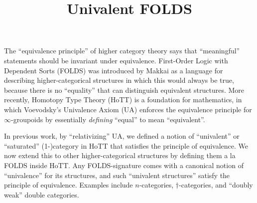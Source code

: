 \documentclass{amsart}
\title{Univalent FOLDS}
\begin{document}
\maketitle

The ``equivalence principle'' of higher category theory says that ``meaningful'' statements should be invariant under equivalence.
First-Order Logic with Dependent Sorts (FOLDS) was introduced by Makkai as a language for describing higher-categorical structures in which this would always be true, because there is no ``equality'' that can distinguish equivalent structures.
More recently, Homotopy Type Theory (HoTT) is a foundation for mathematics, in which Voevodsky's Univalence Axiom (UA) enforces the equivalence principle for $\infty$-groupoids by essentially \emph{defining} ``equal'' to mean ``equivalent''.

In previous work, by ``relativizing'' UA, we defined a notion of ``univalent'' or ``saturated'' (1-)category in HoTT that satisfies the principle of equivalence.
We now extend this to other higher-categorical structures by defining them a la FOLDS inside HoTT.
Any FOLDS-signature comes with a canonical notion of ``univalence'' for its structures, and such ``univalent structures'' satisfy the principle of equivalence.
Examples include $n$-categories, $\dagger$-categories, and ``doubly weak'' double categories.
\end{document}
